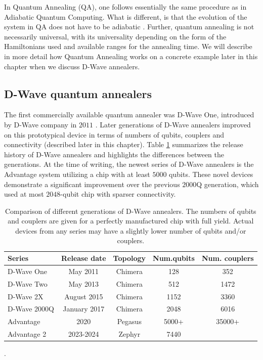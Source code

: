 In Quantum Annealing (QA), one follows essentially the same procedure as in Adiabatic Quantum
Computing. What is different, is that the evolution of the system in QA does not have to be
adiabatic \cite{Vinci2017}. Further, quantum annealing is not necessarily universal, with its
universality depending on the form of the Hamiltonians used and available ranges for the annealing
time. We will describe in more detail how Quantum Annealing works on a concrete example later in
this chapter when we discuss D-Wave annealers.

\subsection{D-Wave quantum annealers}

The first commercially available quantum annealer was D-Wave One, introduced by D-Wave company in
$2011$ \cite{johnson}. Later generations of D-Wave annealers improved on this prototypical device in
terms of numbers of qubits, couplers and connectivity (described later in this chapter). Table
\ref{tab:dwave} summarizes the release history of D-Wave annealers and highlights the differences
between the generations. At the time of writing, the newest series of D-Wave annealers is the
Advantage system utilizing a chip with at least $5000$ qubits. These novel devices demonstrate a
significant improvement over the previous $2000$Q generation, which used at most $2048$-qubit chip with
sparser connectivity. 

\begin{table}
    \label{tab:dwave}
\begin{tabular}[pos]{|l|c|c|c|c|}
\hline
\textbf{Series} & 
\textbf{Release date} &
\textbf{Topology} & 
\textbf{Num.\newline qubits} & 
\textbf{Num. couplers}\\ 
\hline    
D-Wave One & May 2011 & Chimera & 128 & 352 \\
\hline
D-Wave Two & May 2013 & Chimera & 512 & 1472 \\
\hline
D-Wave 2X & August 2015 & Chimera & 1152 & 3360 \\
\hline
D-Wave 2000Q & January 2017 & Chimera & 2048 & 6016\\
\hline
Advantage & 2020 & Pegasus & 5000+ & 35000+ \\
\hline
Advantage 2 & 2023-2024 & Zephyr & 7440 & \\ 
\hline
\end{tabular}
\caption{Comparison of different generations of D-Wave annealers. The numbers of qubits and couplers
are given for a perfectly manufactured chip with full yield. Actual devices from any series may
have a slightly lower number of qubits and/or couplers. }.
\end{table}


